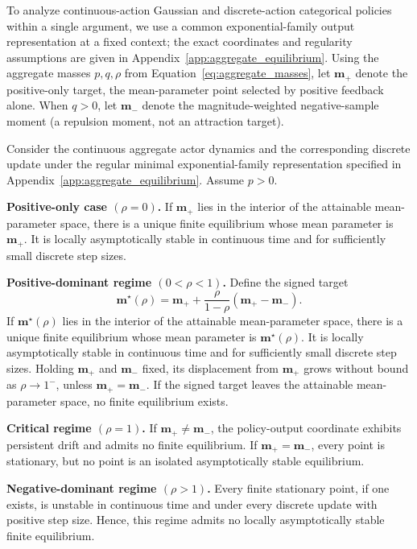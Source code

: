 \documentclass[sigconf,anonymous,review]{acmart}
\theoremstyle{acmdefinition}
\begin{document}
To analyze continuous-action Gaussian and discrete-action categorical
policies within a single argument, we use a common exponential-family
output representation at a fixed context; the exact coordinates and
regularity assumptions are given in
Appendix~\ref{app:aggregate_equilibrium}. Using the aggregate masses
\(p,q,\rho\) from Equation~\eqref{eq:aggregate_masses}, let
\(\mathbf m_+\) denote the positive-only target, the mean-parameter point
selected by positive feedback alone. When \(q>0\), let \(\mathbf m_-\)
denote the magnitude-weighted negative-sample moment (a repulsion moment,
not an attraction target).

\begin{theorem}
\label{thm:aggregate_equilibria}
Consider the continuous aggregate actor dynamics and the corresponding
discrete update under the regular minimal exponential-family
representation specified in
Appendix~\ref{app:aggregate_equilibrium}. Assume \(p>0\).

\textbf{Positive-only case \((\rho=0)\).}
If \(\mathbf m_+\) lies in the interior of the attainable mean-parameter
space, there is a unique finite equilibrium whose mean parameter is
\(\mathbf m_+\). It is locally asymptotically stable in continuous time
and for sufficiently small discrete step sizes.

\textbf{Positive-dominant regime \((0<\rho<1)\).}
Define the signed target
\begin{equation}
    \mathbf m^\star(\rho)
    =
    \mathbf m_+
    +
    \frac{\rho}{1-\rho}
    \left(
        \mathbf m_+-\mathbf m_-
    \right).
    \label{eq:signed_target_ratio}
\end{equation}
If \(\mathbf m^\star(\rho)\) lies in the interior of the attainable
mean-parameter space, there is a unique finite equilibrium whose mean
parameter is \(\mathbf m^\star(\rho)\). It is locally asymptotically
stable in continuous time and for sufficiently small discrete step
sizes. Holding \(\mathbf m_+\) and \(\mathbf m_-\) fixed, its displacement
from \(\mathbf m_+\) grows without bound as \(\rho\to1^-\), unless
\(\mathbf m_+=\mathbf m_-\). If the signed target leaves the attainable
mean-parameter space, no finite equilibrium exists.

\textbf{Critical regime \((\rho=1)\).}
If \(\mathbf m_+\neq\mathbf m_-\), the policy-output coordinate exhibits
persistent drift and admits no finite equilibrium. If
\(\mathbf m_+=\mathbf m_-\), every point is stationary, but no point is
an isolated asymptotically stable equilibrium.

\textbf{Negative-dominant regime \((\rho>1)\).}
Every finite stationary point, if one exists, is unstable in continuous
time and under every discrete update with positive step size. Hence,
this regime admits no locally asymptotically stable finite equilibrium.
\end{theorem}
\end{document}
